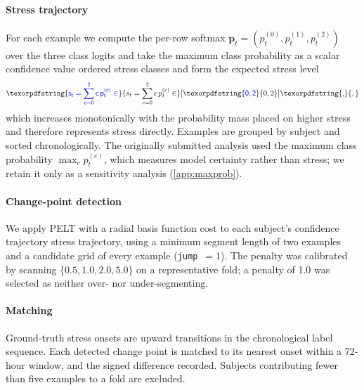 \documentclass[preprint,12pt,authoryear]{elsarticle}
\providecommand{\DIFaddtex}[1]{{\protect\color{blue} \sf #1}} %
\providecommand{\DIFdeltex}[1]{{\protect\color{red} \scriptsize #1}} %
\providecommand{\DIFaddbegin}{} %
\providecommand{\DIFaddend}{} %
\providecommand{\DIFdelbegin}{} %
\providecommand{\DIFdelend}{} %
\providecommand{\DIFadd}[1]{\texorpdfstring{\DIFaddtex{#1}}{#1}} %
\providecommand{\DIFdel}[1]{\texorpdfstring{\DIFdeltex{#1}}{}} %
\newcommand{\DIFscaledelfig}{0.5}
\newlength{\DIFdelgraphicswidth} %
\newlength{\DIFdelgraphicsheight} %
\newcommand{\DIFaddincludegraphics}[2][]{{\color{blue}\fbox{\DIFOincludegraphics[#1]{#2}}}} %
\newcommand{\DIFdelincludegraphics}[2][]{%
\sbox{\DIFdelgraphicsbox}{\DIFOincludegraphics[#1]{#2}}%
\settoboxwidth{\DIFdelgraphicswidth}{\DIFdelgraphicsbox} %
\settoboxtotalheight{\DIFdelgraphicsheight}{\DIFdelgraphicsbox} %
\scalebox{\DIFscaledelfig}{%
\parbox[b]{\DIFdelgraphicswidth}{\usebox{\DIFdelgraphicsbox}\\[-\baselineskip] \rule{\DIFdelgraphicswidth}{0em}}\llap{\resizebox{\DIFdelgraphicswidth}{\DIFdelgraphicsheight}{%
\setlength{\unitlength}{\DIFdelgraphicswidth}%
\begin{picture}(1,1)%
\thicklines\linethickness{2pt} %
{\color[rgb]{1,0,0}\put(0,0){\framebox(1,1){}}}%
{\color[rgb]{1,0,0}\put(0,0){\line( 1,1){1}}}%
{\color[rgb]{1,0,0}\put(0,1){\line(1,-1){1}}}%
\end{picture}%
}\hspace*{3pt}}} %
} %
\DeclareRobustCommand{\DIFaddbegin}{\DIFOaddbegin \let\includegraphics\DIFaddincludegraphics} %
\DeclareRobustCommand{\DIFaddend}{\DIFOaddend \let\includegraphics\DIFOincludegraphics} %
\DeclareRobustCommand{\DIFdelbegin}{\DIFOdelbegin \let\includegraphics\DIFdelincludegraphics} %
\DeclareRobustCommand{\DIFdelend}{\DIFOaddend \let\includegraphics\DIFOincludegraphics} %
\begin{document}
\DIFdelbegin %
\DIFdelend \DIFaddbegin \paragraph{Stress trajectory} \DIFaddend For each example we compute the
per-row softmax \DIFaddbegin \DIFadd{$\mathbf{p}_t = (p_t^{(0)}, p_t^{(1)}, p_t^{(2)})$ }\DIFaddend over
the three \DIFdelbegin \DIFdel{class logits and take the maximum class
probability as a scalar confidence value}\DIFdelend \DIFaddbegin \DIFadd{ordered stress classes and form the expected stress level
}\begin{equation}
\DIFadd{s_t = \sum_{c=0}^{2} c \, p_t^{(c)} \in }[\DIFadd{0, 2}]\DIFadd{,
\label{eq:stress}
}\end{equation}
\DIFadd{which increases monotonically with the probability mass placed on
higher stress and therefore represents stress directly}\DIFaddend . Examples are
grouped by subject and sorted chronologically. \DIFaddbegin \DIFadd{The originally submitted
analysis used the maximum class probability $\max_c p_t^{(c)}$, which
measures model certainty rather than stress; we retain it only as a
sensitivity analysis (\ref{app:maxprob}).
}\DIFaddend 

\DIFdelbegin %
\DIFdelend \DIFaddbegin \paragraph{Change-point detection} \DIFaddend We apply PELT \citep{killick2012}
with a radial basis function cost to each subject's \DIFdelbegin \DIFdel{confidence
trajectory}\DIFdelend \DIFaddbegin \DIFadd{stress
trajectory, using a minimum segment length of two examples and a
candidate grid of every example (\texttt{jump}~$=1$)}\DIFaddend . The penalty was calibrated by scanning
$\{0.5, 1.0, 2.0, 5.0\}$ on a representative fold; a penalty of 1.0
was selected as neither over- nor under-segmenting.

\DIFdelbegin %
\DIFdelend \DIFaddbegin \paragraph{Matching} \DIFaddend Ground-truth stress onsets are upward transitions
in the chronological label sequence. Each detected change point is
matched to its nearest onset within a 72-hour window, and the signed difference recorded. Subjects contributing fewer than five examples to
a fold are excluded.
\end{document}
